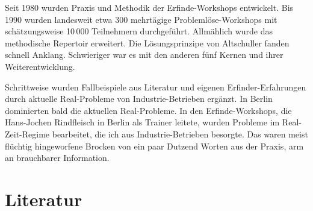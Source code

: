 \documentclass[11pt,a4paper]{article}
\begin{document}
Seit 1980 wurden Praxis und Methodik der Erfinde-Workshops entwickelt. Bis 1990
wurden landesweit etwa 300 mehrtägige Problemlöse-Workshops mit schätzungsweise
10\,000 Teilnehmern durchgeführt. Allmählich wurde das methodische Repertoir
erweitert. Die Lösungsprinzipe von Altschuller fanden schnell Anklang.
Schwieriger war es mit den anderen fünf Kernen und ihrer Weiterentwicklung.

Schrittweise wurden Fallbeispiele aus Literatur und eigenen
Erfinder-Erfahrungen durch aktuelle Real-Probleme von Industrie-Betrieben
ergänzt.  In Berlin dominierten bald die aktuellen Real-Probleme. In den
Erfinde-Workshops, die Hans-Jochen Rindfleisch in Berlin als Trainer leitete,
wurden Probleme im Real-Zeit-Regime bearbeitet, die ich aus Industrie-Betrieben
besorgte. Das waren meist flüchtig hingeworfene Brocken von ein paar Dutzend
Worten aus der Praxis, arm an brauchbarer Information.

\section*{Literatur}
\end{document}
